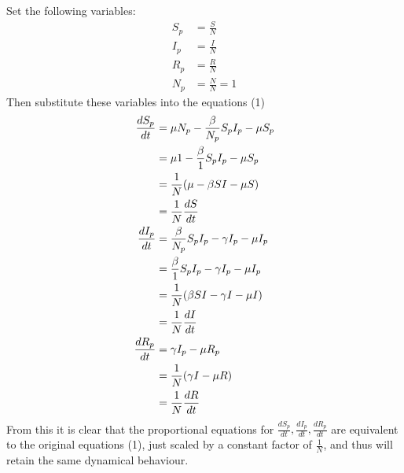 Set the following variables:
\begin{align*}
    S_p &= \frac{S}{N}\\
    I_p &= \frac{I}{N}\\
    R_p &= \frac{R}{N}\\
    N_p &= \frac{N}{N} = 1
\end{align*}
Then substitute these variables into the equations (1)
\begin{align}
  \frac{dS_p}{dt} &= \mu N_p -\frac{\beta}{N_p} S_p I_p - \mu S_p\\
                  &= \mu 1 -\frac{\beta}{1} S_p I_p - \mu S_p\\
                  &= \frac{1}{N}(\mu -\beta SI - \mu S)\\
                  &= \frac{1}{N} \frac{dS}{dt}\\
  \vspace{8pt}
  \frac{dI_p}{dt} &= \frac{\beta}{N_p} S_p I_p - \gamma I_p - \mu I_p\\
                  &= \frac{\beta}{1} S_p I_p - \gamma I_p - \mu I_p\\
                  &= \frac{1}{N} (\beta SI - \gamma I - \mu I)\\
                  &= \frac{1}{N} \frac{dI}{dt}\\
  \vspace{8pt}
  \frac{dR_p}{dt} &= \gamma I_p - \mu R_p\\
                  &= \frac{1}{N} (\gamma I - \mu R)\\
                  &= \frac{1}{N} \frac{dR}{dt}
\end{align}
From this it is clear that the proportional equations for $\frac{dS_p}{dt},\frac{dI_p}{dt},\frac{dR_p}{dt}$ are equivalent to the original equations (1), just scaled by a constant factor of $\frac{1}{N}$, and thus will retain the same dynamical behaviour.
